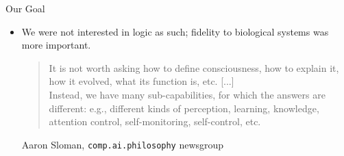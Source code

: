 \documentclass{beamer}
\begin{document}
   \begin{frame}{Our Goal}
      \begin{itemize}
         \item We were not interested in logic as such; fidelity to biological systems was more important.
         
         \begin{quotation}
            It is not worth asking how to define consciousness, how to explain it, how it
            evolved, what its function is, etc. [...]\\
            Instead, we have many sub-capabilities, for which the answers are different: e.g., different kinds of perception, learning, knowledge, attention control, self-monitoring, self-control, etc.
         \end{quotation}
         
         Aaron Sloman, \texttt{comp.ai.philosophy} newsgroup
      \end{itemize}
   \end{frame}
   
%         
%
   
\end{document}
